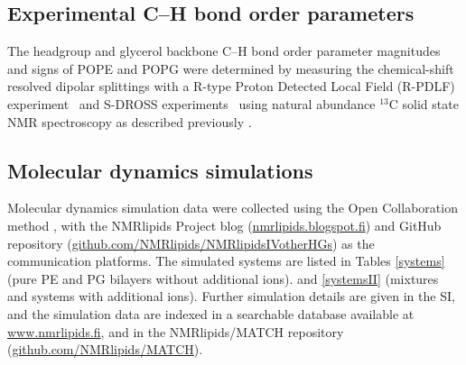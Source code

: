 \documentclass[aps,prl,superscriptaddress,twocolumn]{revtex4}
\begin{document}
\subsection{Experimental C--H bond order parameters}%

The headgroup and glycerol backbone C--H bond order parameter magnitudes and signs of POPE and POPG
were determined by measuring the chemical-shift resolved dipolar splittings
with a R-type Proton Detected Local Field (R-PDLF) experiment~\cite{dvinskikh04} and
S-DROSS experiments~\cite{gross97} using natural abundance $^{13}$C solid state NMR spectroscopy
as described previously \cite{ferreira13,ferreira16,NMRlipidsIVps}.

\subsection{Molecular dynamics simulations}

Molecular dynamics simulation data were collected using
the Open Collaboration method \cite{botan15}, with
the NMR\-lipids Project blog (\url{nmrlipids.blogspot.fi}) and
GitHub repository (\url{github.com/NMRlipids/NMRlipidsIVotherHGs})
as the communication platforms.
The simulated systems are listed in 
Tables \ref{systems} (pure PE and PG bilayers without additional ions).
and \ref{systemsII} (mixtures and systems with additional ions).
Further simulation details are given in the SI, and
the simulation data are indexed in a
searchable database available at \url{www.nmrlipids.fi},
and in the NMRlipids/MATCH repository (\url{github.com/NMRlipids/MATCH}).
\end{document}
